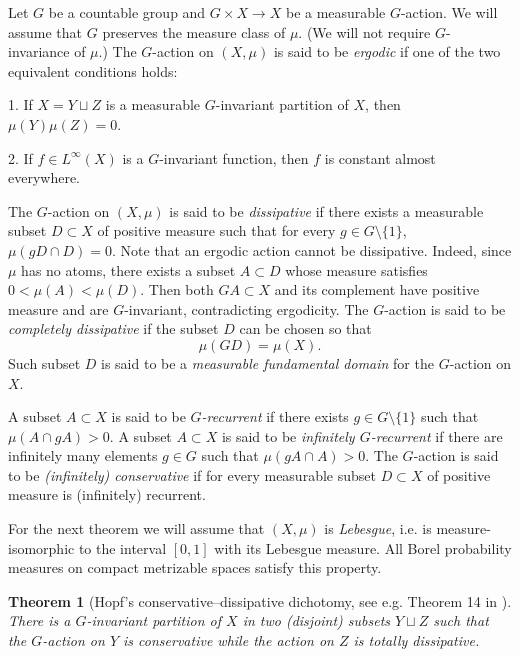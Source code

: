 \documentclass[12pt]{amsbook}%
\newtheorem{thm}{Theorem}[chapter]
\theoremstyle{definition}
\theoremstyle{remark}
\numberwithin{section}{chapter}
\numberwithin{subsection}{section}
\numberwithin{figure}{chapter}
\def\kap{}
\begin{document}
{{Let $G$ be a countable group and $G\times X\to X$ be a measurable $G$-action. We will assume that $G$ preserves the measure class of $\mu$. (We will 
not require $G$-invariance of $\mu$.) The $G$-action on $(X,\mu)$  is said to be {\em ergodic} if one of the two equivalent conditions holds:

1. If $X=Y\sqcup Z$ is a measurable $G$-invariant partition of $X$, then $\mu(Y)\mu(Z)=0$. 

2. If $f\in L^\infty(X)$ is a $G$-invariant function, then $f$ is constant almost everywhere. 

The $G$-action on $(X,\mu)$ is said to be {\em dissipative} if there exists a measurable subset $D\subset X$ of positive measure such that for every 
$g\in G\setminus \{1\}$, $\mu(gD\cap D)=0$. Note that an ergodic action cannot be dissipative. Indeed, since $\mu$ has no atoms, there exists a subset $A\subset D$ 
whose measure satisfies $0<\mu(A)<\mu(D)$. Then both $GA\subset X$ and its complement have positive measure and are $G$-invariant, contradicting ergodicity.  
The $G$-action is said to be {\em completely dissipative} 
if the subset $D$ can be chosen so that 
$$
\mu(G D)=\mu(X). 
$$
Such subset $D$ is said to be a {\em measurable fundamental domain} for the $G$-action on $X$. 

A subset $A\subset X$  is said to be 
{\em $G$-recurrent} if there exists $g\in G\setminus \{1\}$ such that $\mu(A\cap gA)>0$. 
A subset $A\subset X$ is said to be {\em infinitely $G$-recurrent} if there are infinitely many elements $g\in G$ such that $\mu(gA\cap A)>0$. 
The $G$-action is said to be {\em (infinitely) conservative} if for every measurable subset $D\subset X$ of positive measure is (infinitely) recurrent. 

For the next theorem we will assume that $(X,\mu)$ is {\em Lebesgue}, i.e. is measure-isomorphic to the interval $[0,1]$ with its Lebesgue measure. 
 All Borel probability measures on compact metrizable spaces satisfy this property. 


\begin{thm}
[Hopf's conservative--dissipative dichotomy, see e.g. Theorem 14 in \cite{Kaimanovich}] 
There is a $G$-invariant partition of $X$ in two (disjoint) subsets $Y\sqcup Z$ such that the $G$-action on $Y$ is conservative while the action on $Z$ is totally dissipative. 
\end{thm}


}}
\end{document}

